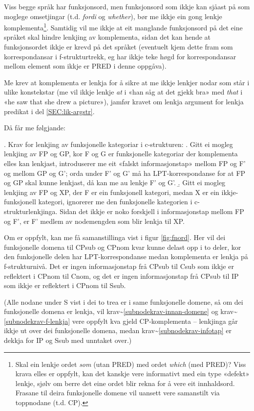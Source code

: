 \documentclass[11pt,a4paper,oneside,draft]{book}
\begin{document}
Viss begge språk har funksjonsord, men funksjonsord som ikkje kan
sjåast på som moglege omsetjingar (t.d. \emph{fordi} og \emph{whether}), bør me
ikkje ein gong lenkje komplementa\footnote{Skal ein lenkje ordet \emph{som} (utan PRED) med ordet \emph{which} (med
        PRED)? Viss krava elles er oppfylt, kan det kanskje vere
        informativt med ein type «defekt» lenkje, sjølv om berre det
        eine ordet blir rekna for å vere eit innhaldsord. Frasane til
        deira funksjonelle domene vil uansett vere samanstilt via
        toppnodane (t.d. CP). }. Samtidig vil me ikkje at eit
manglande funksjonsord på det eine språket skal hindre lenkjing av
komplementa, sidan det kan hende at funksjonsordet ikkje er krevd på
det språket (eventuelt kjem dette fram som korrespondansar i
f-strukturtrekk, eg har ikkje teke høgd for korrespondansar mellom
element som ikkje er PRED i denne oppgåva).

Me krev at komplementa er lenkja for å sikre at me ikkje lenkjer nodar
som står i ulike konstekstar (me vil ikkje lenkje \emph{at} i «han såg at
det gjekk bra» med \emph{that} i «he saw that she drew a picture»), jamfør
kravet om lenkja argument for lenkja predikat i del
\ref{SEC:lik-argstr}.

Då får me følgjande:

\ex. \label{fnordkrav} Krav for lenkjing av funksjonelle kategoriar i c-strukturen:
\a. Gitt ei mogleg lenkjing av FP og GP, kor F og G er funksjonelle
    kategoriar der komplementa elles kan lenkjast, introduserer me eit
    «falskt informasjonstap» mellom FP og F' og mellom GP og G'; orda
    under F' og G' må ha LPT-korrespondanse for at FP og GP skal kunne
    lenkjast, då kan me au lenkje F' og G'.  
\b. Gitt ei mogleg lenkjing av FP og XP, der F er ein funksjonell
    kategori, medan X er ein ikkje-funksjonell kategori, ignorerer me
    den funksjonelle kategorien i c-strukturlenkjinga. Sidan det ikkje
    er noko forskjell i informasjonstap mellom FP og F', er F' medlem
    av nodemengden som blir lenkja til XP.


Om \Last[a] er oppfylt, kan me få samanstillinga vist i figur
\ref{fig:fnord}. Her vil dei funksjonelle domena til CPsub og CPnom
kvar kunne delast opp i to deler, kor den funksjonelle delen har
LPT-korrespondanse medan komplementa er lenkja på f-strukturnivå. Det
er ingen informasjonstap frå CPsub til Csub som ikkje er reflektert i
CPnom til Cnom, og det er ingen informasjonstap frå CPsub til IP som
ikkje er reflektert i CPnom til Ssub.

(Alle nodane under S vist i dei to trea er i same funksjonelle domene,
så om dei funksjonelle domena er lenkja, vil
krav\~{}\ref{subnodekrav-innan-domene} og krav\~{}\ref{subnodekrav-f-lenkja}
vere oppfylt kva gjeld CP-komplementa -- lenkjinga går ikkje ut over
dei funksjonelle domena, medan krav\~{}\ref{subnodekrav-infotap} er
dekkja for IP og Ssub med unntaket over.)
\end{document}
